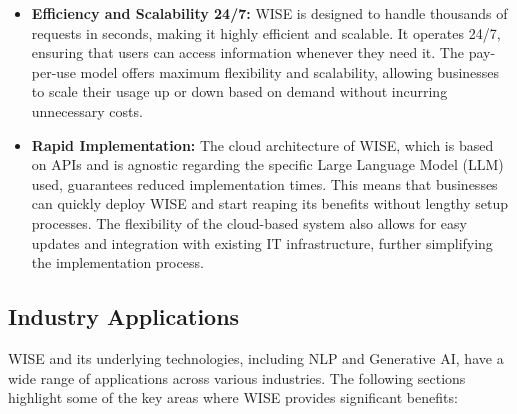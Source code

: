 \begin{itemize}
    \item \textbf{Efficiency and Scalability 24/7:} WISE is designed to handle thousands of requests in seconds, making it highly efficient and scalable. It operates 24/7, ensuring that users can access information whenever they need it. The pay-per-use model offers maximum flexibility and scalability, allowing businesses to scale their usage up or down based on demand without incurring unnecessary costs.
    
    \item \textbf{Rapid Implementation:} The cloud architecture of WISE, which is based on APIs and is agnostic regarding the specific Large Language Model (LLM) used, guarantees reduced implementation times. This means that businesses can quickly deploy WISE and start reaping its benefits without lengthy setup processes. The flexibility of the cloud-based system also allows for easy updates and integration with existing IT infrastructure, further simplifying the implementation process. \cite{hpa2024}
\end{itemize}


\subsection{Industry Applications}

WISE and its underlying technologies, including NLP and Generative AI, have a wide range of applications across various industries. The following sections highlight some of the key areas where WISE provides significant benefits:

